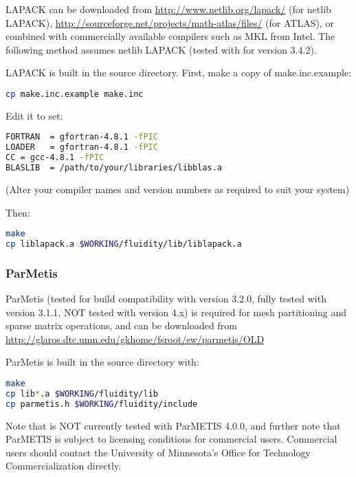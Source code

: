 LAPACK can be downloaded from \url{http://www.netlib.org/lapack/} (for netlib
LAPACK), \url{http://sourceforge.net/projects/math-atlas/files/} (for ATLAS),
or combined with commercially available compilers such as MKL from Intel. The
following method assumes netlib LAPACK (tested with \fluidity for version
3.4.2).

LAPACK is built in the source directory. First, make a copy of
make.inc.example:

\begin{lstlisting}[language=bash]
cp make.inc.example make.inc
\end{lstlisting}

Edit it to set:

\begin{lstlisting}[language=bash]
FORTRAN  = gfortran-4.8.1 -fPIC
LOADER   = gfortran-4.8.1 -fPIC
CC = gcc-4.8.1 -fPIC
BLASLIB  = /path/to/your/libraries/libblas.a
\end{lstlisting}

(Alter your compiler names and version numbers as required to suit your system)

Then:

\begin{lstlisting}[language=bash]
make
cp liblapack.a $WORKING/fluidity/lib/liblapack.a
\end{lstlisting}

\subsubsection{ParMetis}
\label{sec:required_libraries_numerical_parmetis}

ParMetis (tested for \fluidity build compatibility with version 3.2.0, fully
tested with version 3.1.1, NOT tested with version 4.x) is required for mesh
partitioning and sparse matrix operations, and can be downloaded from
\url{http://glaros.dtc.umn.edu/gkhome/fsroot/sw/parmetis/OLD}

ParMetis is built in the source directory with:

\begin{lstlisting}[language=bash]
make
cp lib*.a $WORKING/fluidity/lib
cp parmetis.h $WORKING/fluidity/include
\end{lstlisting}

Note that \fluidity is NOT currently tested with ParMETIS 4.0.0, and further
note that ParMETIS is subject to licensing conditions for commercial users.
Commercial users should contact the University of Minnesota's Office for
Technology Commercialization directly. 

